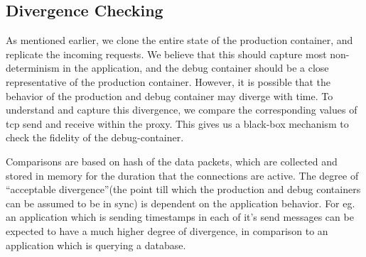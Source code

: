 


\subsection{Divergence Checking}
\label{sec:divergenceChecking}

As mentioned earlier, we clone the entire state of the production container, and replicate the incoming requests. 
We believe that this should capture most non-determinism in the application, and the debug container should be a close representative of the production container. 
However, it is possible that the behavior of the production and debug container may diverge with time.
To understand and capture this divergence, we compare the corresponding values of tcp send and receive within the proxy.
This gives us a black-box mechanism to check the fidelity of the debug-container.

Comparisons are based on hash of the data packets, which are collected and stored in memory for the duration that the connections are active.
The degree of ``acceptable divergence''(the point till which the production and debug containers can be assumed to be in sync) is dependent on the application behavior. 
For eg. an application which is sending timestamps in each of it's send messages can be expected to have a much higher degree of divergence, in comparison to an application which is querying a database.

